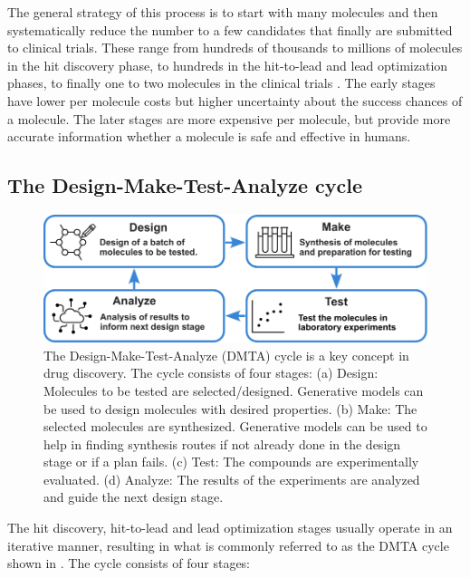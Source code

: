 The general strategy of this process is to start with many molecules and then
systematically reduce the number to a few candidates that finally are submitted to clinical trials.
These range from hundreds of thousands to millions of molecules in the hit discovery phase, to hundreds
in the hit-to-lead and lead optimization phases, to finally one to two molecules in the clinical trials \citep{hughesPrinciplesEarlyDrug2011}.
The early stages have lower per molecule costs but higher uncertainty about the success
chances of a molecule. The later stages are more expensive per molecule, but provide more accurate information
whether a molecule is safe and effective in humans.


\subsection{The Design-Make-Test-Analyze cycle}
\begin{figure}
	\centering
	\includegraphics[width=\textwidth]{figures/dmta_cycle_v2.pdf}
	\caption{The Design-Make-Test-Analyze (DMTA) cycle is a key concept in drug discovery. The
		cycle consists of four stages: (a) Design: Molecules to be tested are selected/designed.
		Generative models can be used to design molecules with desired properties. (b) Make: The
		selected molecules are synthesized. Generative models can be used to help in finding
		synthesis routes if not already done in the design stage or if a plan fails. (c) Test:
		The compounds are experimentally evaluated. (d) Analyze: The results of the experiments
		are analyzed and guide the next design stage. \label{fig:dmta-cycle}}
\end{figure}
The hit discovery, hit-to-lead and lead optimization stages usually operate in an iterative manner,
resulting in what is commonly referred to as the \ac{DMTA} cycle \citep{wesolowskiStrategiesPoliticsSuccessful2016}
shown in . The cycle consists of four stages:
